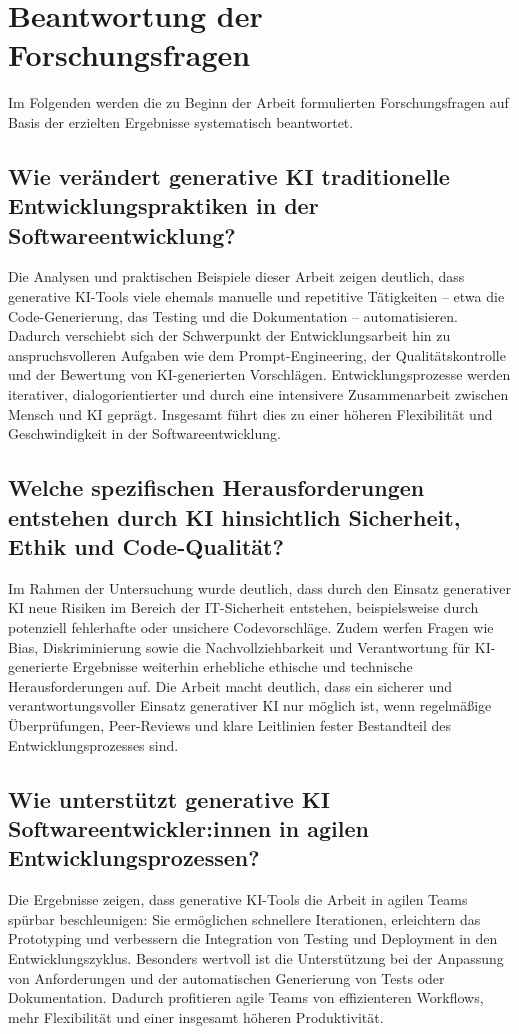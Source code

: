 \section{Beantwortung der Forschungsfragen}

Im Folgenden werden die zu Beginn der Arbeit formulierten Forschungsfragen auf
Basis der erzielten Ergebnisse systematisch beantwortet.

\subsection*{Wie verändert generative KI traditionelle Entwicklungspraktiken in der Softwareentwicklung?}
Die Analysen und praktischen Beispiele dieser Arbeit zeigen deutlich, dass
generative KI-Tools viele ehemals manuelle und repetitive Tätigkeiten – etwa
die Code-Generierung, das Testing und die Dokumentation – automatisieren.
Dadurch verschiebt sich der Schwerpunkt der Entwicklungsarbeit hin zu
anspruchsvolleren Aufgaben wie dem Prompt-Engineering, der Qualitätskontrolle
und der Bewertung von KI-generierten Vorschlägen. Entwicklungsprozesse werden
iterativer, dialogorientierter und durch eine intensivere Zusammenarbeit
zwischen Mensch und KI geprägt. Insgesamt führt dies zu einer höheren
Flexibilität und Geschwindigkeit in der Softwareentwicklung.

\subsection*{Welche spezifischen Herausforderungen entstehen durch KI hinsichtlich Sicherheit, Ethik und Code-Qualität?}
Im Rahmen der Untersuchung wurde deutlich, dass durch den Einsatz generativer
KI neue Risiken im Bereich der IT-Sicherheit entstehen, beispielsweise durch
potenziell fehlerhafte oder unsichere Codevorschläge. Zudem werfen Fragen wie
Bias, Diskriminierung sowie die Nachvollziehbarkeit und Verantwortung für
KI-generierte Ergebnisse weiterhin erhebliche ethische und technische
Herausforderungen auf. Die Arbeit macht deutlich, dass ein sicherer und
verantwortungsvoller Einsatz generativer KI nur möglich ist, wenn regelmäßige
Überprüfungen, Peer-Reviews und klare Leitlinien fester Bestandteil des
Entwicklungsprozesses sind.

\subsection*{Wie unterstützt generative KI Softwareentwickler:innen in agilen Entwicklungsprozessen?}
Die Ergebnisse zeigen, dass generative KI-Tools die Arbeit in agilen Teams
spürbar beschleunigen: Sie ermöglichen schnellere Iterationen, erleichtern das
Prototyping und verbessern die Integration von Testing und Deployment in den
Entwicklungszyklus. Besonders wertvoll ist die Unterstützung bei der Anpassung
von Anforderungen und der automatischen Generierung von Tests oder
Dokumentation. Dadurch profitieren agile Teams von effizienteren Workflows,
mehr Flexibilität und einer insgesamt höheren Produktivität.

